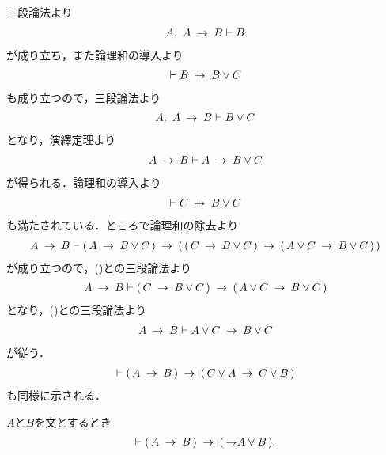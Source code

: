 	\begin{sketch}
		三段論法より
		\begin{align}
			A,\ A \rarrow B \vdash B
		\end{align}
		が成り立ち，また論理和の導入より
		\begin{align}
			\vdash B \rarrow B \vee C
		\end{align}
		も成り立つので，三段論法より
		\begin{align}
			A,\ A \rarrow B \vdash B \vee C
		\end{align}
		となり，演繹定理より
		\begin{align}
			A \rarrow B \vdash A \rarrow B \vee C
			\label{fom:heredity_of_implication_to_disjunction_1}
		\end{align}
		が得られる．論理和の導入より
		\begin{align}
			\vdash C \rarrow B \vee C
			\label{fom:heredity_of_implication_to_disjunction_2}
		\end{align}
		も満たされている．ところで論理和の除去より
		\begin{align}
			A \rarrow B \vdash (\, A \rarrow B \vee C\, )
			\rarrow (\, (\, C \rarrow B \vee C\, )
			\rarrow (\, A \vee C \rarrow B \vee C\, )\, )
		\end{align}
		が成り立つので，()との三段論法より
		\begin{align}
			A \rarrow B \vdash (\, C \rarrow B \vee C\, )
			\rarrow (\, A \vee C \rarrow B \vee C\, )
		\end{align}
		となり，()との三段論法より
		\begin{align}
			A \rarrow B \vdash A \vee C \rarrow B \vee C
		\end{align}
		が従う．
		\begin{align}
			\vdash (\, A \rarrow B\, ) \rarrow (\, C \vee A \rarrow C \vee B\, )
		\end{align}
		も同様に示される．
		\QED
	\end{sketch}
	
	\begin{screen}
		\begin{logicalthm}[含意は否定と論理和で表せる]
		\label{logicalthm:implication_rewritable_by_disjunction_of_negation}
			$A$と$B$を文とするとき
			\begin{align}
				\vdash (\, A \rarrow B\, ) \rarrow (\, \negation A \vee B\, ).
			\end{align}
		\end{logicalthm}
	\end{screen}
	
